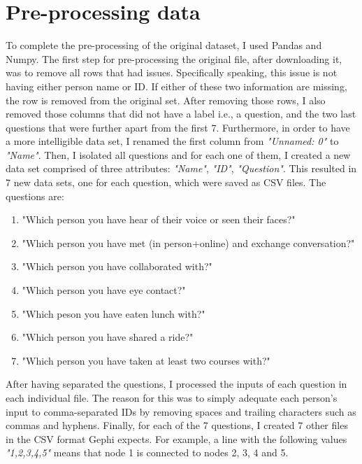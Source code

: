 \section{Pre-processing data}
To complete the pre-processing of the original dataset, I used Pandas and Numpy. The first step for pre-processing the original file, after downloading it, was to remove all rows that had issues. Specifically speaking, this issue is not having either person name or ID. If either of these two information are missing, the row is removed from the original set. After removing those rows, I also removed those columns that did not have a label i.e., a question, and the two last questions that were further apart from the first 7. Furthermore, in order to have a more intelligible data set, I renamed the first column from \textit{"Unnamed: 0"} to \textit{"Name"}. Then, I isolated all questions and for each one of them, I created a new data set comprised of three attributes: \textit{"Name"}, \textit{"ID"}, \textit{"Question"}. This resulted in 7 new data sets, one for each question, which were saved as CSV files. The questions are:

\begin{enumerate}
    \item "Which person you have hear of their voice or seen their faces?"
    \item "Which person you have met (in person+online) and exchange conversation?"
    \item "Which person you have collaborated with?"
    \item "Which person you have eye contact?"
    \item "Which peson you have eaten lunch with?"
    \item "Which person you have shared a ride?"
    \item "Which person you have taken at least two courses with?"
\end{enumerate}

After having separated the questions, I processed the inputs of each question in each individual file. The reason for this was to simply adequate each person's input to comma-separated IDs by removing spaces and trailing characters such as commas and hyphens. Finally, for each of the 7 questions, I created 7 other files in the CSV format Gephi expects. For example, a line with the following values \textit{"1,2,3,4,5"} means that node 1 is connected to nodes 2, 3, 4 and 5.